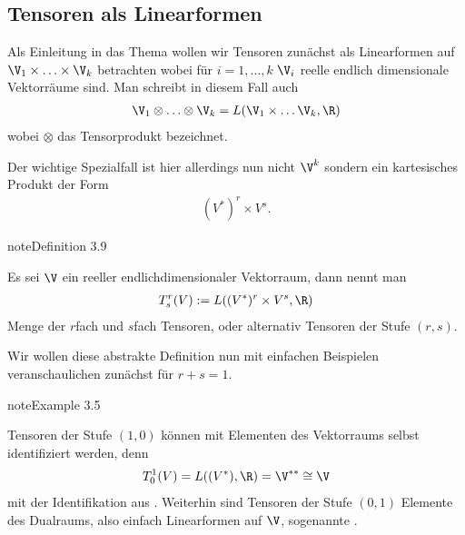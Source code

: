 \documentclass[letterpaper,10pt,english]{jupyterBook}
\begin{document}
\subsection{Tensoren als Linearformen}
\label{\detokenize{vektoranalysis/tensor:tensoren-als-linearformen}}
\sphinxAtStartPar
Als Einleitung in das Thema wollen wir Tensoren zunächst als Linearformen auf \(\V_1\times\ldots\times\V_k\)
betrachten wobei für \(i=1,\ldots,k\) \(\V_i\) reelle endlich dimensionale Vektorräume sind.
Man schreibt in diesem Fall auch
\begin{equation*}
\begin{split}\V_1\otimes\ldots\otimes\V_k = L(\V_1\times\ldots\V_k,\R)\end{split}
\end{equation*}
\sphinxAtStartPar
wobei \(\otimes\) das Tensorprodukt bezeichnet.

\sphinxAtStartPar
Der wichtige Spezialfall ist hier allerdings nun nicht \(\V^k\) sondern ein kartesisches Produkt der Form
\begin{equation*}
\begin{split}(V^\ast)^r\times V^s.\end{split}
\end{equation*}\label{vektoranalysis/tensor:definition-5}
\begin{sphinxadmonition}{note}{Definition 3.9}



\sphinxAtStartPar
Es sei \(\V\) ein reeller endlich\sphinxhyphen{}dimensionaler Vektorraum, dann nennt man
\begin{equation*}
\begin{split}T^r_s(V) := L((V^\ast)^r\times V^s, \R)\end{split}
\end{equation*}
\sphinxAtStartPar
Menge der \(r\)\sphinxhyphen{}fach  und \(s\)\sphinxhyphen{}fach  Tensoren, oder alternativ Tensoren der Stufe \((r,s)\).
\end{sphinxadmonition}

\sphinxAtStartPar
Wir wollen diese abstrakte Definition nun mit einfachen Beispielen veranschaulichen zunächst für \(r+s=1\).
\label{vektoranalysis/tensor:example-6}
\begin{sphinxadmonition}{note}{Example 3.5}



\sphinxAtStartPar
Tensoren der Stufe \((1,0)\) können mit Elementen des Vektorraums selbst identifiziert werden, denn
\begin{equation*}
\begin{split}T^1_0(V) = L((V^\ast), \R) = \V^{\ast\ast}\cong \V\end{split}
\end{equation*}
\sphinxAtStartPar
mit der Identifikation aus {\hyperref[\detokenize{vektoranalysis/multilinear:lem:doubledual}]{}}. Weiterhin sind Tensoren der Stufe \((0,1)\) Elemente des
Dualraums, also einfach Linearformen auf \(\V\), sogenannte .
\end{sphinxadmonition}
\end{document}
